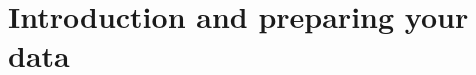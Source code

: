 \documentclass[a4paper, 10pt]{article}
\begin{document}



\section{Introduction and preparing your data}


\newpage


\end{document}
